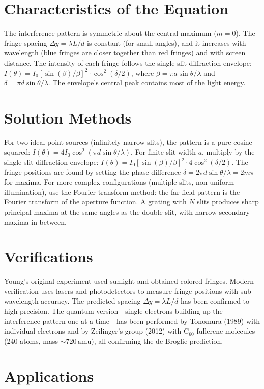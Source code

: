 \section*{Characteristics of the Equation}

The interference pattern is symmetric about the central maximum ($m = 0$). The fringe spacing $\Delta y = \lambda L/d$ is constant (for small angles), and it increases with wavelength (blue fringes are closer together than red fringes) and with screen distance. The intensity of each fringe follows the single-slit diffraction envelope: $I(\theta) = I_0[\sin(\beta)/\beta]^2 \cdot \cos^2(\delta/2)$, where $\beta = \pi a\sin\theta/\lambda$ and $\delta = \pi d\sin\theta/\lambda$. The envelope's central peak contains most of the light energy.
\section*{Solution Methods}

For two ideal point sources (infinitely narrow slits), the pattern is a pure cosine squared: $I(\theta) = 4I_0\cos^2(\pi d\sin\theta/\lambda)$. For finite slit width $a$, multiply by the single-slit diffraction envelope: $I(\theta) = I_0[\sin(\beta)/\beta]^2 \cdot 4\cos^2(\delta/2)$. The fringe positions are found by setting the phase difference $\delta = 2\pi d\sin\theta/\lambda = 2m\pi$ for maxima. For more complex configurations (multiple slits, non-uniform illumination), use the Fourier transform method: the far-field pattern is the Fourier transform of the aperture function. A grating with $N$ slits produces sharp principal maxima at the same angles as the double slit, with narrow secondary maxima in between.
\section*{Verifications}

Young's original experiment used sunlight and obtained colored fringes. Modern verification uses lasers and photodetectors to measure fringe positions with sub-wavelength accuracy. The predicted spacing $\Delta y = \lambda L/d$ has been confirmed to high precision. The quantum version---single electrons building up the interference pattern one at a time---has been performed by Tonomura (1989) with individual electrons and by Zeilinger's group (2012) with C$_{60}$ fullerene molecules (240 atoms, mass $\sim 720\,\text{amu}$), all confirming the de Broglie prediction.
\section*{Applications}

